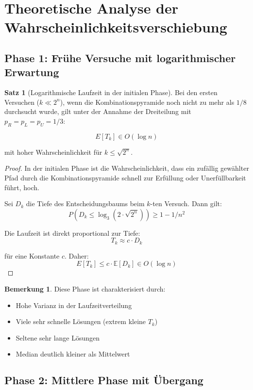 ﻿\documentclass[a4paper,12pt]{article}
\theoremstyle{definition}
\newtheorem{satz}{Satz}
\newtheorem{bemerkung}{Bemerkung}
\begin{document}
\section{Theoretische Analyse der \\
Wahrscheinlichkeitsverschiebung}

\subsection{Phase 1: Frühe Versuche mit logarithmischer Erwartung}

\begin{satz}[Logarithmische Laufzeit in der initialen Phase]
\label{satz:log-phase}
Bei den ersten Versuchen ($k \ll 2^n$), wenn die Kombinationspyramide noch nicht zu mehr als $1/8$ durchsucht wurde, gilt unter der Annahme der Dreiteilung mit $p_R = p_L = p_U = 1/3$:

\[
E[T_k] \in O(\log n)
\]

mit hoher Wahrscheinlichkeit für $k \leq \sqrt{2^n}$.
\end{satz}

\begin{proof}
In der initialen Phase ist die Wahrscheinlichkeit, dass ein zufällig gewählter Pfad durch die Kombinationspyramide schnell zur Erfüllung oder Unerfüllbarkeit führt, hoch.

Sei $D_k$ die Tiefe des Entscheidungsbaums beim $k$-ten Versuch. Dann gilt:
\[
P(D_k \leq \log_3(2 \cdot \sqrt{2^n})) \geq 1 - 1/n^2
\]

Die Laufzeit ist direkt proportional zur Tiefe:
\[
T_k \approx c \cdot D_k
\]

für eine Konstante $c$. Daher:
\[
E[T_k] \leq c \cdot \mathbb{E}[D_k] \in O(\log n)
\]
\end{proof}

\begin{bemerkung}
Diese Phase ist charakterisiert durch:
\begin{itemize}
	\item Hohe Varianz in der Laufzeitverteilung
	\item Viele sehr schnelle Lösungen (extrem kleine $T_k$)
	\item Seltene sehr lange Lösungen
	\item Median deutlich kleiner als Mittelwert
\end{itemize}
\end{bemerkung}

\subsection{Phase 2: Mittlere Phase mit Übergang}
\end{document}
